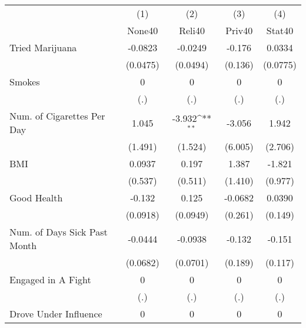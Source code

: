 {
\def\sym#1{\ifmmode^{#1}\else\(^{#1}\)\fi}
\begin{tabular}{l*{4}{c}}
\hline\hline
            &\multicolumn{1}{c}{(1)}&\multicolumn{1}{c}{(2)}&\multicolumn{1}{c}{(3)}&\multicolumn{1}{c}{(4)}\\
            &\multicolumn{1}{c}{None40}&\multicolumn{1}{c}{Reli40}&\multicolumn{1}{c}{Priv40}&\multicolumn{1}{c}{Stat40}\\
\hline
Tried Marijuana&     -0.0823         &     -0.0249         &      -0.176         &      0.0334         \\
            &    (0.0475)         &    (0.0494)         &     (0.136)         &    (0.0775)         \\
[1em]
Smokes      &           0         &           0         &           0         &           0         \\
            &         (.)         &         (.)         &         (.)         &         (.)         \\
[1em]
Num. of Cigarettes Per Day&       1.045         &      -3.932\sym{**} &      -3.056         &       1.942         \\
            &     (1.491)         &     (1.524)         &     (6.005)         &     (2.706)         \\
[1em]
BMI         &      0.0937         &       0.197         &       1.387         &      -1.821         \\
            &     (0.537)         &     (0.511)         &     (1.410)         &     (0.977)         \\
[1em]
Good Health &      -0.132         &       0.125         &     -0.0682         &      0.0390         \\
            &    (0.0918)         &    (0.0949)         &     (0.261)         &     (0.149)         \\
[1em]
Num. of Days Sick Past Month&     -0.0444         &     -0.0938         &      -0.132         &      -0.151         \\
            &    (0.0682)         &    (0.0701)         &     (0.189)         &     (0.117)         \\
[1em]
Engaged in A Fight&           0         &           0         &           0         &           0         \\
            &         (.)         &         (.)         &         (.)         &         (.)         \\
[1em]
Drove Under Influence&           0         &           0         &           0         &           0         \\

\end{tabular}}
